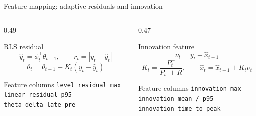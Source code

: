 \documentclass[aspectratio=169,10pt,t]{beamer}
\newcommand{\code}[1]{\texttt{\footnotesize #1}}
\begin{document}
\begin{frame}{Feature mapping: adaptive residuals and innovation}
\small
\begin{columns}[T,totalwidth=\textwidth]
\begin{column}{0.49\textwidth}
\begin{block}{RLS residual}
\[
\hat{y}_t=\phi_t^\top\theta_{t-1},\qquad
r_t=|y_t-\hat{y}_t|
\]
\[
\theta_t=\theta_{t-1}+K_t(y_t-\hat{y}_t)
\]
\end{block}
\begin{exampleblock}{Feature columns}
\code{level residual max}\\
\code{linear residual p95}\\
\code{theta delta late-pre}
\end{exampleblock}
\end{column}
\begin{column}{0.47\textwidth}
\begin{alertblock}{Innovation feature}
\[
\nu_t=y_t-\hat{x}_{t-1}
\]
\[
K_t=\frac{P_t^-}{P_t^-+R},\qquad
\hat{x}_t=\hat{x}_{t-1}+K_t\nu_t
\]
\end{alertblock}
\begin{exampleblock}{Feature columns}
\code{innovation max}\\
\code{innovation mean / p95}\\
\code{innovation time-to-peak}
\end{exampleblock}
\end{column}
\end{columns}
\vspace{2mm}
\centering
{}
\end{frame}
\end{document}
